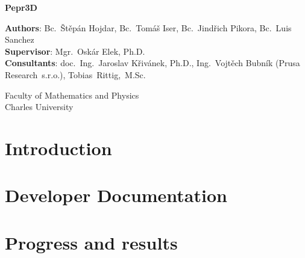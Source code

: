 \documentclass[12pt,a4paper]{report}
\begin{document}
\begin{titlepage}
    \begin{center}
        \vspace*{1cm}

        \Huge
        \textbf{Pepr3D}

        \LARGE

        \vspace{12cm}

		\Large
        \textbf{Authors}:
        Bc.~Štěpán Hojdar,
        Bc.~Tomáš Iser,
        Bc.~Jindřich Pikora,
		Bc.~Luis Sanchez
		\\
		\textbf{Supervisor}: Mgr.~Oskár Elek, Ph.D.
		\\
		\textbf{Consultants}: doc.~Ing.~Jaroslav Křivánek, Ph.D., Ing.~Vojtěch Bubník (Prusa Research~s.r.o.), Tobias~Rittig,~M.Sc.

        \vfill

		Faculty of Mathematics and Physics \\
		Charles University
    \end{center}
\end{titlepage}

\setcounter{tocdepth}{1}
\tableofcontents

\part{Introduction}




\part{Developer Documentation}












\part{Progress and results}
\end{document}

